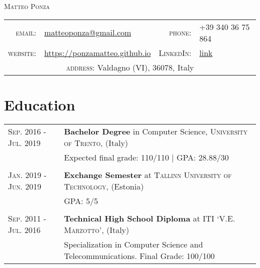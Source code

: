 \documentclass[a4paper,11pt]{article}
\begin{document}
\pagestyle{empty} %
\par{\centering
		{\Huge \textsc{Matteo Ponza}
	}\par}
\begin{center}
\begin{tabular}{rlrl}
  \textsc{email:}     & \href{mailto:matteoponza@gmail.com}{matteoponza@gmail.com} &
  \textsc{phone:}     & +39 340 36 75 864\\
  \textsc{website:}   & \href{https://ponzamatteo.github.io/}{https://ponzamatteo.github.io} & \textsc{LinkedIn:} & \href{https://www.linkedin.com/in/matteo-ponza-557136135}{link}\\
  \multicolumn{4}{c}{\textsc{address:} \quad Valdagno (VI), 36078, Italy} \\
\end{tabular}
\end{center}

\section{Education}
\begin{tabular}{m{0.225\linewidth}|p{0.775\linewidth}}
  \textsc{Sep. 2016 - Jul. 2019} &
  \textbf{Bachelor Degree} in Computer Science,
  \textsc{University of Trento}, (Italy)\\
  & Expected final grade: 110/110 | \textsc{GPA}: 28.88/30\\
  \multicolumn{2}{c}{} \\

  \textsc{Jan. 2019 - Jun. 2019}& 
  \textbf{Exchange Semester} at \textsc{Tallinn University of Technology}, (Estonia)\\& GPA: 5/5 \\

  \multicolumn{2}{c}{} \\
  \textsc{Sep. 2011 - Jul. 2016} &
  \textbf{Technical High School Diploma} at \textsc{ITI ‘V.E. Marzotto’}, (Italy)
\\ & Specialization in Computer Science and Telecommunications. Final Grade: 100/100
\end{tabular}
\end{document}
